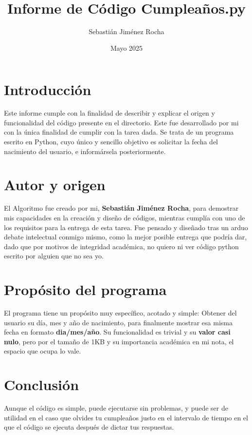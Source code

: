 \documentclass{article}
\title{Informe de Código Cumpleaños.py}
\author{Sebastián Jiménez Rocha}
\date{Mayo 2025}
\begin{document}
\maketitle

\section{Introducción}
Este informe cumple con la finalidad de describir y explicar el origen y funcionalidad del código presente en el directorio. Este fue desarrollado por mi con la única finalidad de cumplir con la tarea dada. Se trata de un programa escrito en Python, cuyo único y sencillo objetivo es solicitar la fecha del nacimiento del usuario, e informársela posteriormente.

\section{Autor y origen}
El Algoritmo fue creado por mi, \textbf{Sebastián Jiménez Rocha}, para demostrar mis capacidades en la creación y diseño de códigos, mientras cumplía con uno de los requisitos para la entrega de esta tarea. Fue pensado y diseñado tras un arduo debate intelectual conmigo mismo, como la mejor posible entrega que podría dar, dado que por motivos de integridad académica, no quiero ni ver código python escrito por alguien que no sea yo.

\section{Propósito del programa}
El programa tiene un propósito muy específico, acotado y simple: Obtener del usuario su día, mes y año de nacimiento, para finalmente mostrar esa misma fecha en formato \textbf{dia/mes/año}. Su funcionalidad es trivial y su \textbf{valor casi nulo}, pero por el tamaño de 1KB y su importancia académica en mi nota, el espacio que ocupa lo vale.

\section{Conclusión}
Aunque el código es simple, puede ejecutarse sin problemas, y puede ser de utilidad en el caso que olvides tu cumpleaños justo en el intervalo de tiempo en el que el código se ejecuta después de dictar tus respuestas.
\end{document}
